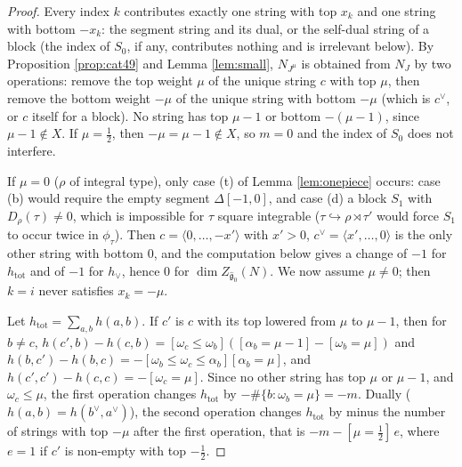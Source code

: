 \documentclass[a4paper,12pt,leqno]{amsart}
\theoremstyle{plain}
\theoremstyle{definition}
\begin{document}
\begin{proof}
Every index $k$ contributes exactly one string with top $x_k$ and one string with bottom $-x_k$: the
segment string and its dual, or the self-dual string of a block (the index of $S_0$, if any,
contributes nothing and is irrelevant below). By Proposition \ref{prop:cat49} and Lemma \ref{lem:small}, $N_{J^\mu}$ is
obtained from $N_J$ by two operations: remove the top weight $\mu$ of the unique string $c$ with top
$\mu$, then remove the bottom weight $-\mu$ of the unique string with bottom $-\mu$ (which is
$c^\vee$, or $c$ itself for a block). No string has top $\mu-1$ or bottom $-(\mu-1)$, since
$\mu-1\notin X$. If $\mu=\tfrac12$, then $-\mu=\mu-1\notin X$, so $m=0$ and the index of $S_0$ does not
interfere.

If $\mu=0$ ($\rho$ of integral type), only case (t) of Lemma \ref{lem:onepiece} occurs: case (b) would require
the empty segment $\Delta[-1,0]$, and case (d) a block $S_1$ with $D_\rho(\tau)\neq0$, which is
impossible for $\tau$ square integrable ($\tau\hookrightarrow\rho\rtimes\tau'$ would force $S_1$ to occur
twice in $\phi_\tau$). Then $c=\langle0,\ldots,-x'\rangle$ with $x'>0$, $c^\vee=\langle x',\ldots,0\rangle$ is the only other string with bottom $0$, and the
computation below gives a change of $-1$ for $h_{\mathrm{tot}}$ and of $-1$ for $h_\vee$, hence $0$ for
$\dim Z_{\widehat{\mathfrak g}_0}(N)$. We now assume $\mu\neq0$; then $k=i$ never satisfies
$x_k=-\mu$.

Let $h_{\mathrm{tot}}=\sum_{a,b}h(a,b)$. If $c'$ is $c$ with its top lowered from $\mu$ to $\mu-1$, then for
$b\neq c$, $h(c',b)-h(c,b)=[\omega_c\leq \omega_b]([\alpha_b=\mu-1]-[\omega_b=\mu])$ and $h(b,c')-h(b,c)=-[\omega_b\leq
\omega_c\leq \alpha_b][\alpha_b=\mu]$, and $h(c',c')-h(c,c)=-[\omega_c=\mu]$. Since no other string has top $\mu$ or
$\mu-1$, and $\omega_c\leq\mu$, the first operation changes $h_{\mathrm{tot}}$ by $-\#\{b:\omega_b=\mu\}=-m$. Dually
($h(a,b)=h(b^\vee,a^\vee)$), the second operation changes $h_{\mathrm{tot}}$ by minus the number of strings with top
$-\mu$ after the first operation, that is $-m-[\mu=\tfrac12]\,e$, where $e=1$ if $c'$ is non-empty with
top $-\tfrac12$.


\end{proof}
\end{document}
